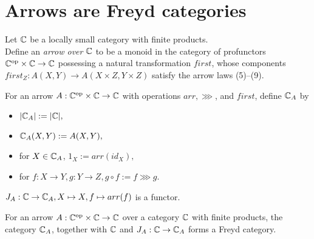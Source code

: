 \section{Arrows are Freyd categories}

\frame{\tableofcontents[currentsection]}

\begin{frame}
\begin{definition}
    Let $\mathbb{C}$ be a locally small category with finite products. \\
    \vspace{1em}
    Define an
    \emph{arrow over $\mathbb{C}$} to be a monoid in the category of profunctors
    ${\mathbb{C}}^{\text{op}} \times \mathbb{C} \to \mathbb{C}$ possessing a natural transformation
    $first$, whose components $first_Z: A(X, Y) \to A(X \times Z, Y \times Z)$
    satisfy the arrow laws (5)--(9).
\end{definition}
\end{frame}

\begin{frame}
\begin{definition}
    For an arrow $A : {\mathbb{C}}^{\text{op}} \times \mathbb{C} \to \mathbb{C}$ with operations
    $arr, \ggg$, and $first$, define $\mathbb{C}_A$ by
    \begin{itemize}
        \item $|\mathbb{C}_A| := |\mathbb{C}|,$
        \item $\mathbb{C}_A(X, Y) := A(X, Y),$
        \item for $X \in \mathbb{C}_A$, $1_X := arr(id_X),$
        \item for $f: X \to Y, g: Y \to Z, g \circ f := f \ggg g$.
    \end{itemize}
\end{definition}

\begin{proposition}
    $J_A : \mathbb{C} \to \mathbb{C}_A, X \mapsto X, f \mapsto arr(f)$ is a functor.
\end{proposition}
\end{frame}

\begin{frame}
\begin{lemma}
    For an arrow $A : {\mathbb{C}}^{\text{op}} \times \mathbb{C} \to \mathbb{C}$ over a category
    $\mathbb{C}$ with finite products, the category $\mathbb{C}_A$, together with $\mathbb{C}$
    and $J_A : \mathbb{C} \to \mathbb{C}_A$ forms a Freyd category.
\end{lemma}
\end{frame}

